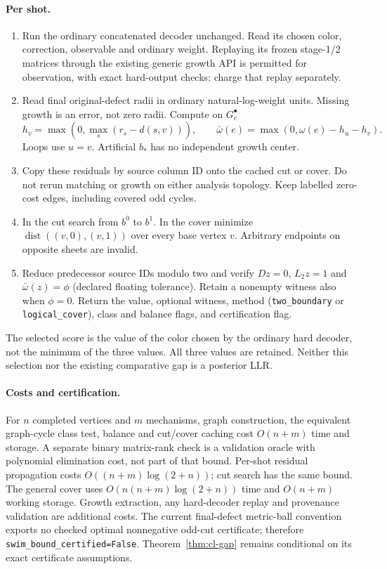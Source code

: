 \paragraph{Per shot.}
\begin{enumerate}
\item Run the ordinary concatenated decoder unchanged. Read its chosen
color, correction, observable and ordinary weight. Replaying its frozen
stage-1/2 matrices through the existing generic growth API is permitted
for observation, with exact hard-output checks; charge that replay separately.
\item Read final original-defect radii in ordinary natural-log-weight units.
Missing growth is an error, not zero radii. Compute on $G_c^\bullet$
\[
 h_v=\max(0,\max_s(r_s-d(s,v))),\qquad
 \bar\omega(e)=\max(0,\omega(e)-h_u-h_v).
\]
Loops use $u=v$. Artificial $b_*$ has no independent growth center.
\item Copy these residuals by source column ID onto the cached cut or
cover. Do not rerun matching or growth on either analysis topology.
Keep labelled zero-cost edges, including covered odd cycles.
\item In the cut search from $b^0$ to $b^1$. In the cover minimize
$\operatorname{dist}((v,0),(v,1))$ over every base vertex $v$.
Arbitrary endpoints on opposite sheets are invalid.
\item Reduce predecessor source IDs modulo two and verify $Dz=0$,
$L_2z=1$ and $\bar\omega(z)=\phi$ (declared floating tolerance).
Retain a nonempty witness also when $\phi=0$.
Return the value, optional witness, method (\texttt{two\_boundary} or
\texttt{logical\_cover}), class and balance flags, and certification flag.
\end{enumerate}
The selected score is the value of the color chosen by the ordinary hard
decoder, not the minimum of the three values. All three values are retained.
Neither this selection nor the existing comparative gap is a posterior LLR.

\paragraph{Costs and certification.}
For $n$ completed vertices and $m$ mechanisms, graph construction, the
equivalent graph-cycle class test, balance and cut/cover caching cost
$O(n+m)$ time and storage. A separate binary matrix-rank check is a
validation oracle with polynomial elimination cost, not part of that bound.
Per-shot residual propagation costs $O((n+m)\log(2+n))$; cut search has
the same bound. The general cover uses
$O(n(n+m)\log(2+n))$ time and $O(n+m)$ working storage.
Growth extraction, any hard-decoder replay and provenance validation are
additional costs. The current final-defect metric-ball convention exports
no checked optimal nonnegative odd-cut certificate; therefore
\texttt{swim\_bound\_certified=False}. Theorem~\ref{thm:cl-gap} remains
conditional on its exact certificate assumptions.
